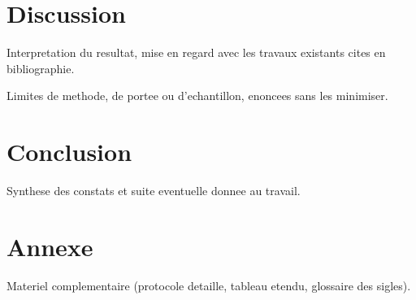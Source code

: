 \documentclass[11pt,a4paper]{article}
\begin{document}
\section{Discussion}

Interpretation du resultat, mise en regard avec les travaux existants cites en bibliographie.

\begin{limite}
Limites de methode, de portee ou d'echantillon, enoncees sans les minimiser.
\end{limite}

\section{Conclusion}

Synthese des constats et suite eventuelle donnee au travail.




\appendix
\section{Annexe}

Materiel complementaire (protocole detaille, tableau etendu, glossaire des sigles).
\end{document}
